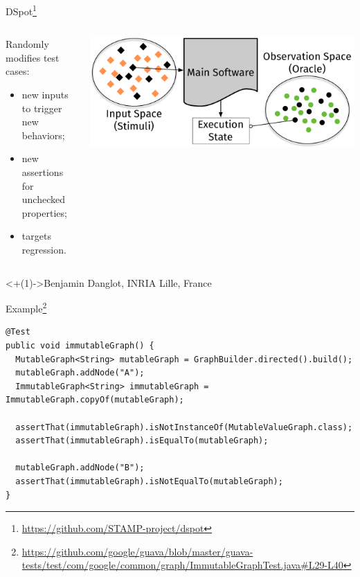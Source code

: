 \documentclass[aspectratio=169]{beamer}
\begin{document}
\begin{frame}{DSpot\footnote{\url{https://github.com/STAMP-project/dspot}}}
  \begin{columns}
    \begin{column}{0.5\textwidth}
      Randomly modifies test cases:
      \begin{itemize}[<+(1)->]
        \item new inputs to trigger new behaviors;
        \item new assertions for unchecked properties;
        \item targets regression.
      \end{itemize}
    \end{column}
    \begin{column}{0.5\textwidth}
      \hspace*{-0.05\textwidth}
      \includegraphics[width=1.1\textwidth]{spaces.pdf}
    \end{column}
  \end{columns}
  \vfill{}
  \visible<+(1)->{Benjamin Danglot, INRIA Lille, France}
\end{frame}

\begin{frame}[fragile]{Example\footnote{\href{https://github.com/google/guava/blob/ea66419b6aa52678816df77caa304e617255cca5/guava-tests/test/com/google/common/graph/ImmutableGraphTest.java\#L29-L40}{https://github.com/google/guava/blob/master/guava-tests/test/com/google/common/graph/ImmutableGraphTest.java\#L29-L40}}}
  \begin{verbatim}
@Test
public void immutableGraph() {
  MutableGraph<String> mutableGraph = GraphBuilder.directed().build();
  mutableGraph.addNode("A");
  ImmutableGraph<String> immutableGraph = ImmutableGraph.copyOf(mutableGraph);

  assertThat(immutableGraph).isNotInstanceOf(MutableValueGraph.class);
  assertThat(immutableGraph).isEqualTo(mutableGraph);

  mutableGraph.addNode("B");
  assertThat(immutableGraph).isNotEqualTo(mutableGraph);
}
  \end{verbatim}
\end{frame}
\end{document}
